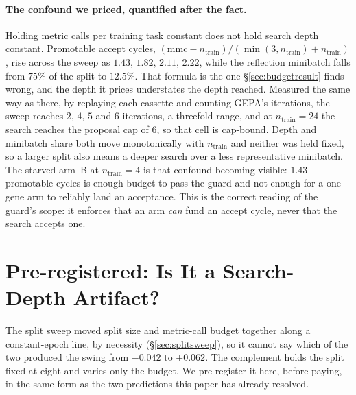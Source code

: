 \documentclass[11pt]{article}
\begin{document}
\paragraph{The confound we priced, quantified after the fact.} Holding metric calls per
training task constant does not hold search depth constant. Promotable accept cycles,
$(\mathrm{mmc} - n_{\mathrm{train}})/(\min(3,n_{\mathrm{train}}) + n_{\mathrm{train}})$, rise
across the sweep as $1.43,\,1.82,\,2.11,\,2.22$, while the reflection minibatch falls from
$75\%$ of the split to $12.5\%$. That formula is the one \S\ref{sec:budgetresult} finds wrong,
and the depth it prices understates the depth reached. Measured the same way as there, by
replaying each cassette and counting GEPA's iterations, the sweep reaches $2$, $4$, $5$ and
$6$ iterations, a threefold range, and at $n_{\mathrm{train}}{=}24$ the search reaches the
proposal cap of $6$, so that cell is cap-bound. Depth and minibatch share both move
monotonically with $n_{\mathrm{train}}$ and neither was held fixed, so a larger split also means
a deeper search over a less representative minibatch. The starved arm~B at
$n_{\mathrm{train}}{=}4$ is that confound becoming visible: $1.43$ promotable cycles is enough
budget to pass the guard and not enough for a one-gene arm to reliably land an acceptance. This
is the correct reading of the guard's scope: it enforces that an arm \emph{can} fund an accept
cycle, never that the search accepts one.

\section{Pre-registered: Is It a Search-Depth Artifact?}
\label{sec:budgetprereg}

The split sweep moved split size and metric-call budget together along a constant-epoch line, by
necessity (\S\ref{sec:splitsweep}), so it cannot say which of the two produced the swing from
$-0.042$ to $+0.062$. The complement holds the split fixed at eight and varies only the budget.
We pre-register it here, before paying, in the same form as the two predictions this paper has
already resolved.
\end{document}
